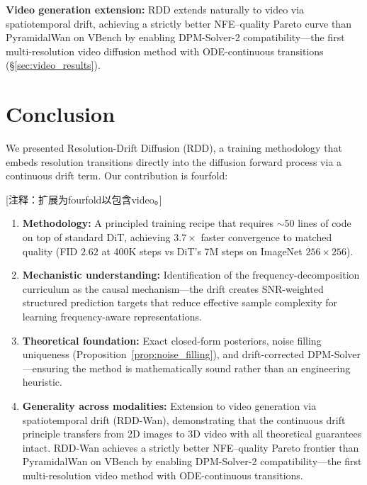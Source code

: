     \item \textbf{Video generation extension:} RDD extends naturally to video via spatiotemporal drift, achieving a strictly better NFE--quality Pareto curve than PyramidalWan on VBench by enabling DPM-Solver-2 compatibility---the first multi-resolution video diffusion method with ODE-continuous transitions (\S\ref{sec:video_results}).



\section{Conclusion}
\label{sec:conclusion}

We presented Resolution-Drift Diffusion (RDD), a training methodology that embeds resolution transitions directly into the diffusion forward process via a continuous drift term.
Our contribution is fourfold:

\textcolor{green!50!black}{[注释：扩展为fourfold以包含video。]}

\begin{enumerate}
    \item \textbf{Methodology:} A principled training recipe that requires $\sim$50 lines of code on top of standard DiT, achieving $3.7\times$ faster convergence to matched quality (FID $2.62$ at 400K steps vs DiT's 7M steps on ImageNet $256\times256$).
    \item \textbf{Mechanistic understanding:} Identification of the frequency-decomposition curriculum as the causal mechanism---the drift creates SNR-weighted structured prediction targets that reduce effective sample complexity for learning frequency-aware representations.
    \item \textbf{Theoretical foundation:} Exact closed-form posteriors, noise filling uniqueness (Proposition~\ref{prop:noise_filling}), and drift-corrected DPM-Solver---ensuring the method is mathematically sound rather than an engineering heuristic.
    \item \textbf{Generality across modalities:} Extension to video generation via spatiotemporal drift (RDD-Wan), demonstrating that the continuous drift principle transfers from 2D images to 3D video with all theoretical guarantees intact. RDD-Wan achieves a strictly better NFE--quality Pareto frontier than PyramidalWan on VBench by enabling DPM-Solver-2 compatibility---the first multi-resolution video method with ODE-continuous transitions.
\end{enumerate}

